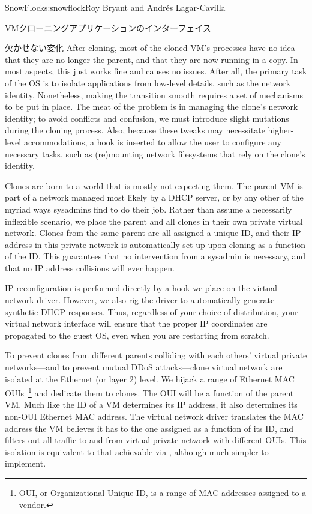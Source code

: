 \begin{aosachapter}{SnowFlock}{s:snowflock}{Roy Bryant and Andr\'e{s} Lagar-Cavilla}
\begin{aosasect1}{VMクローニングアプリケーションのインターフェイス}
\begin{aosasect2}{欠かせない変化}
After cloning, most of the cloned VM's processes have no idea that
they are no longer the parent, and that they are now running in a
copy. In most aspects, this just works fine and causes no
issues. After all, the primary task of the OS is to isolate
applications from low-level details, such as the network identity.
Nonetheless, making the transition smooth requires a set of mechanisms
to be put in place. The meat of the problem is in managing the clone's
network identity; to avoid conflicts and confusion, we must introduce
slight mutations during the cloning process.  Also, because these
tweaks may necessitate higher-level accommodations, a hook is inserted
to allow the user to configure any necessary tasks, such as
(re)mounting network filesystems that rely on the clone's identity.

Clones are born to a world that is mostly not expecting them. The
parent VM is part of a network managed most likely by a DHCP server,
or by any other of the myriad ways sysadmins find to do their
job. Rather than assume a necessarily inflexible scenario, we place
the parent and all clones in their own private virtual network. Clones
from the same parent are all assigned a unique ID, and their IP
address in this private network is automatically set up upon cloning
as a function of the ID\@. This guarantees that no intervention from a
sysadmin is necessary, and that no IP address collisions will ever
happen.

IP reconfiguration is performed directly by a hook we place on the
virtual network driver. However, we also rig the driver to
automatically generate synthetic DHCP responses. Thus, regardless of
your choice of distribution, your virtual network interface will
ensure that the proper IP coordinates are propagated to the guest OS,
even when you are restarting from scratch.

To prevent clones from different parents colliding with each others'
virtual private networks---and to prevent mutual DDoS attacks---clone
virtual network are isolated at the Ethernet (or layer 2) level. We
hijack a range of Ethernet MAC OUIs~\footnote{OUI, or Organizational Unique ID,
is a range of MAC addresses assigned to a vendor.} and dedicate them to clones. The
OUI will be a function of the parent VM\@. Much like the ID of a VM
determines its IP address, it also determines its non-OUI Ethernet MAC
address.  The virtual network driver translates the MAC address the VM
believes it has to the one assigned as a function of its ID, and
filters out all traffic to and from virtual private network with
different OUIs. This isolation is equivalent to that achievable via
, although much simpler to implement.


\end{aosasect2}
\end{aosasect1}
\end{aosachapter}
